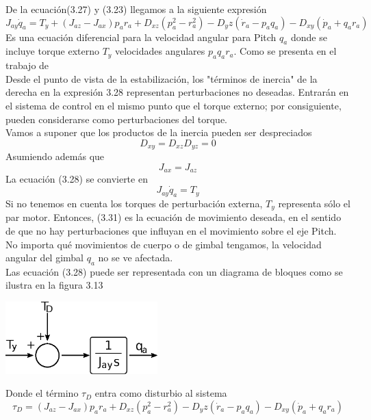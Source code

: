 De la ecuación(3.27) y (3.23) llegamos a la siguiente expresión
\begin{equation}
	J_{ay}\dot{q}_a = T_y + (J_{az} - J_{ax})p_ar_a + D_{xz}(p^2_a - r^2_a) - D_yz(\dot{r}_a - p_aq_a)-D_{xy}(\dot{p}_a + q_ar_a)
\end{equation}
Es una ecuación diferencial para la velocidad angular para Pitch $q_a$ donde se incluye
torque externo $T_y$ velocidades angulares $p_a q_a r_a$. Como se presenta en el trabajo de
\cite{Paper::Yoon2001} \\
Desde el punto de vista de la estabilización, los "términos de inercia" de la derecha en la expresión 3.28
representan perturbaciones no deseadas. Entrarán en el sistema de control en el mismo
punto que el torque externo; por consiguiente, pueden considerarse como perturbaciones del torque.
\\
Vamos a suponer que los productos de la inercia pueden ser despreciados
\begin{equation}
	D_{xy} = D_{xz} D_{yz} = 0
\end{equation}
Asumiendo además que
\begin{equation}
	J_{ax} = J_{az}
\end{equation}
La ecuación (3.28) se convierte en
\begin{equation}
	J_{ay}\dot{q}_a = T_y
\end{equation}
Si no tenemos en cuenta los torques de perturbación externa, $T_y$ representa sólo el
par motor. Entonces, (3.31) es la ecuación de movimiento deseada, en el sentido de que
no hay perturbaciones que influyan en el movimiento sobre el eje Pitch. No importa qué
movimientos de cuerpo o de gimbal tengamos, la velocidad angular del gimbal $q_a$ no se
ve afectada.\\
Las ecuación (3.28) puede ser representada con un diagrama de bloques como se ilustra
en la figura 3.13
\begin{center}
	\includegraphics[width=0.44\textwidth]{Contenido/Cuerpo/Capitulo3/Fig21.eps}
	\label{fig:ModeloMat:Fig1}
\end{center}
Donde el término $\tau_D$ entra como disturbio al sistema
\begin{equation}
	\tau_D = (J_{az} - J_{ax})p_ar_a + D_{xz}(p^2_a - r^2_a) - D_yz(\dot{r}_a - p_aq_a)-D_{xy}(\dot{p}_a + q_ar_a)
\end{equation}

